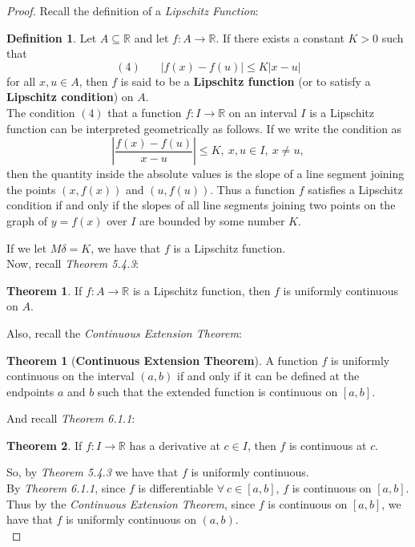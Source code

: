 \documentclass[12pt,letterpaper]{article}
\newcommand{\abs}[1]{\left\lvert #1 \right\rvert}
\newcommand{\R}{\mathbb{R}}
\theoremstyle{case}
\theoremstyle{definition}
\newtheorem{definition*}{Definition}
\newtheorem{theorem}{Theorem}[section]
\newtheorem*{theorem*}{Theorem}
\begin{document}
\begin{enumerate}
\begin{enumerate}
\begin{proof}
				Recall the definition of a \textit{Lipschitz Function}:
				\theoremstyle{definition}
				\begin{definition*}
					Let $A \subseteq \R$ and let $f:A \rightarrow \R$. If there exists a constant $K > 0$ such that 
					\[(4)\ \ \ \ \ \ \ \ |f(x)-f(u)| \leq K|x-u|\]
					for all $x,u \in A$, then $f$ is said to be a \textbf{Lipschitz function} (or to satisfy a \textbf{Lipschitz condition}) on $A$.\\
					
					The condition $(4)$ that a function $f: I \to \R$ on an interval $I$ is a Lipschitz function can be interpreted geometrically as follows. If we write the condition as
					\[\abs{\frac{f(x)-f(u)}{x-u}}\leq K,\ x,u \in I,\ x \neq u,\]
					then the quantity inside the absolute values is the slope of a line segment joining the points $(x,f(x))$ and $(u,f(u))$. Thus a function $f$ satisfies a Lipschitz condition if and only if the slopes of all line segments joining two points on the graph of $y=f(x)$ over $I$ are bounded by some number $K$.
				\end{definition*}
				If we let $M \delta=K$, we have that $f$ is a Lipschitz function.\\
				
				Now, recall \textit{Theorem 5.4.3}:
				\begin{theorem}
					If $f:A \rightarrow \R$ is a Lipschitz function, then $f$ is uniformly continuous on $A$.
				\end{theorem}
				Also, recall the \textit{Continuous Extension Theorem}:
				\begin{theorem*}[\textbf{Continuous Extension Theorem}]
					A function $f$ is uniformly continuous on the interval $(a,b)$ if and only if it can be defined at the endpoints $a$ and $b$ such that the extended function is continuous on $[a,b]$.
				\end{theorem*}
				And recall \textit{Theorem 6.1.1}:
				\begin{theorem*}
					If $f:I \to \R$ has a derivative at $c \in I$, then $f$ is continuous at $c$.
				\end{theorem*}
				So, by \textit{Theorem 5.4.3} we have that $f$ is uniformly continuous.\\
				
				By \textit{Theorem 6.1.1}, since $f$ is differentiable $\forall\ c \in [a,b]$, $f$ is continuous on $[a,b]$. \\
				
				Thus by the \textit{Continuous Extension Theorem}, since $f$ is continuous on $[a,b]$, we have that $f$ is uniformly continuous on $(a,b)$.\\
				

\end{proof}
\end{enumerate}
\end{enumerate}
\end{document}
